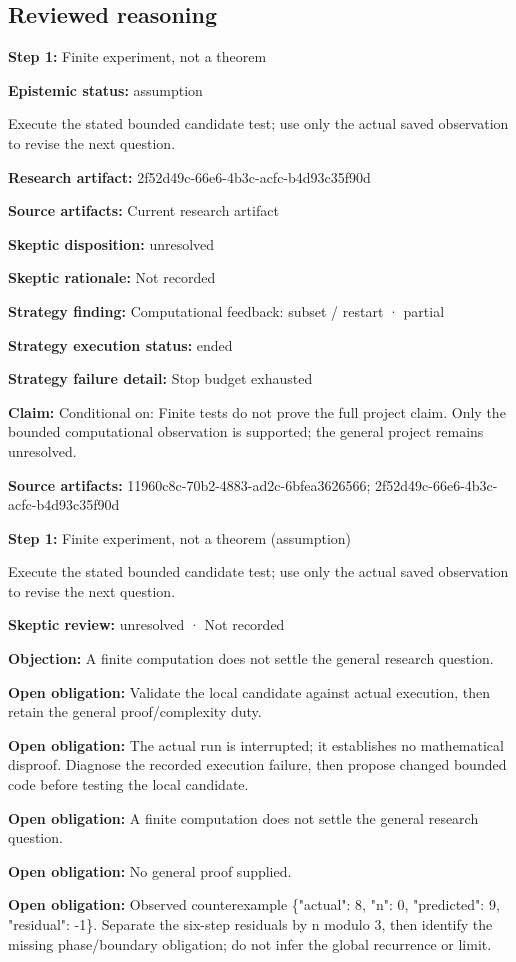 \documentclass[11pt]{article}
\begin{document}
\subsection{Reviewed reasoning}
\textbf{Step 1:} Finite experiment, not a theorem\par
\textbf{Epistemic status:} assumption\par
Execute the stated bounded candidate test; use only the actual saved observation to revise the next question.\par
\textbf{Research artifact:} 2f52d49c-66e6-4b3c-acfc-b4d93c35f90d\par
\textbf{Source artifacts:} Current research artifact\par
\textbf{Skeptic disposition:} unresolved\par
\textbf{Skeptic rationale:} Not recorded\par
\textbf{Strategy finding:} Computational feedback: subset / restart · partial\par
\textbf{Strategy execution status:} ended\par
\textbf{Strategy failure detail:} Stop budget exhausted\par
\textbf{Claim:} Conditional on: Finite tests do not prove the full project claim. Only the bounded computational observation is supported; the general project remains unresolved.\par
\textbf{Source artifacts:} 11960c8c-70b2-4883-ad2c-6bfea3626566; 2f52d49c-66e6-4b3c-acfc-b4d93c35f90d\par
\textbf{Step 1:} Finite experiment, not a theorem (assumption)\par
Execute the stated bounded candidate test; use only the actual saved observation to revise the next question.\par
\textbf{Skeptic review:} unresolved · Not recorded\par
\textbf{Objection:} A finite computation does not settle the general research question.\par
\textbf{Open obligation:} Validate the local candidate against actual execution, then retain the general proof/complexity duty.\par
\textbf{Open obligation:} The actual run is interrupted; it establishes no mathematical disproof. Diagnose the recorded execution failure, then propose changed bounded code before testing the local candidate.\par
\textbf{Open obligation:} A finite computation does not settle the general research question.\par
\textbf{Open obligation:} No general proof supplied.\par
\textbf{Open obligation:} Observed counterexample \{"actual": 8, "n": 0, "predicted": 9, "residual": -1\}. Separate the six-step residuals by n modulo 3, then identify the missing phase/boundary obligation; do not infer the global recurrence or limit.\par
\end{document}
